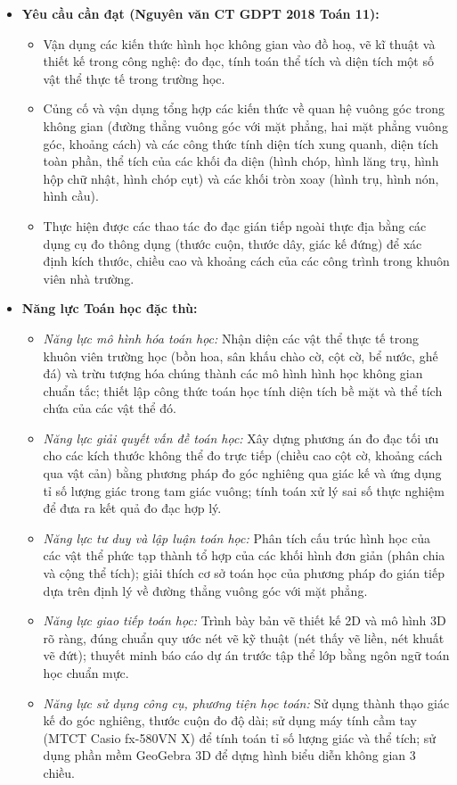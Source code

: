 \documentclass[12pt, a4paper]{article}
\begin{document}
\begin{itemize}[leftmargin=1.2cm]
    \item \textbf{Yêu cầu cần đạt (Nguyên văn CT GDPT 2018 Toán 11):}
    \begin{itemize}[leftmargin=0.6cm]
        \item Vận dụng các kiến thức hình học không gian vào đồ hoạ, vẽ kĩ thuật và thiết kế trong công nghệ: đo đạc, tính toán thể tích và diện tích một số vật thể thực tế trong trường học.
        \item Củng cố và vận dụng tổng hợp các kiến thức về quan hệ vuông góc trong không gian (đường thẳng vuông góc với mặt phẳng, hai mặt phẳng vuông góc, khoảng cách) và các công thức tính diện tích xung quanh, diện tích toàn phần, thể tích của các khối đa diện (hình chóp, hình lăng trụ, hình hộp chữ nhật, hình chóp cụt) và các khối tròn xoay (hình trụ, hình nón, hình cầu).
        \item Thực hiện được các thao tác đo đạc gián tiếp ngoài thực địa bằng các dụng cụ đo thông dụng (thước cuộn, thước dây, giác kế đứng) để xác định kích thước, chiều cao và khoảng cách của các công trình trong khuôn viên nhà trường.
    \end{itemize}

    \item \textbf{Năng lực Toán học đặc thù:}
    \begin{itemize}[leftmargin=0.6cm]
        \item \textit{Năng lực mô hình hóa toán học:} Nhận diện các vật thể thực tế trong khuôn viên trường học (bồn hoa, sân khấu chào cờ, cột cờ, bể nước, ghế đá) và trừu tượng hóa chúng thành các mô hình hình học không gian chuẩn tắc; thiết lập công thức toán học tính diện tích bề mặt và thể tích chứa của các vật thể đó.
        \item \textit{Năng lực giải quyết vấn đề toán học:} Xây dựng phương án đo đạc tối ưu cho các kích thước không thể đo trực tiếp (chiều cao cột cờ, khoảng cách qua vật cản) bằng phương pháp đo góc nghiêng qua giác kế và ứng dụng tỉ số lượng giác trong tam giác vuông; tính toán xử lý sai số thực nghiệm để đưa ra kết quả đo đạc hợp lý.
        \item \textit{Năng lực tư duy và lập luận toán học:} Phân tích cấu trúc hình học của các vật thể phức tạp thành tổ hợp của các khối hình đơn giản (phân chia và cộng thể tích); giải thích cơ sở toán học của phương pháp đo gián tiếp dựa trên định lý về đường thẳng vuông góc với mặt phẳng.
        \item \textit{Năng lực giao tiếp toán học:} Trình bày bản vẽ thiết kế 2D và mô hình 3D rõ ràng, đúng chuẩn quy ước nét vẽ kỹ thuật (nét thấy vẽ liền, nét khuất vẽ đứt); thuyết minh báo cáo dự án trước tập thể lớp bằng ngôn ngữ toán học chuẩn mực.
        \item \textit{Năng lực sử dụng công cụ, phương tiện học toán:} Sử dụng thành thạo giác kế đo góc nghiêng, thước cuộn đo độ dài; sử dụng máy tính cầm tay (MTCT Casio fx-580VN X) để tính toán tỉ số lượng giác và thể tích; sử dụng phần mềm GeoGebra 3D để dựng hình biểu diễn không gian 3 chiều.
    \end{itemize}


\end{itemize}
\end{document}
